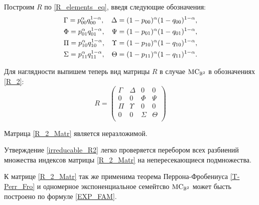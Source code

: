 Построим $R$ по \eqref{R_elements_eq}, введя следующие обозначения:
\begin{align}
\label{R_2}
& \Gamma = p_{00}^\alpha q_{00}^{1 - \alpha}, & \Delta = (1 - p_{00})^\alpha(1 - q_{00})^{1 - \alpha}, \nonumber \\
& \Phi = p_{01}^\alpha q_{01}^{1 - \alpha}, & \Psi = (1 - p_{01})^\alpha(1 - q_{01})^{1 - \alpha}, \nonumber \\
& \Pi = p_{10}^\alpha q_{10}^{1 - \alpha}, & \Upsilon = (1 - p_{10})^\alpha(1 - q_{10})^{1 - \alpha}, \nonumber \\
& \Sigma = p_{11}^\alpha q_{11}^{1 - \alpha}, & \Theta = (1 - p_{11})^\alpha(1 - q_{11})^{1 - \alpha}. 
\end{align}

Для наглядности выпишем теперь вид матрицы $R$ в случае $\mathrm{MC}_{\mathbb{B}^2}$ в обозначениях \eqref{R_2}:
\begin{equation} \label{R_2_Matr}
R = 
\begin{pmatrix}
\Gamma & \Delta & 0 & 0 \\
0 & 0 & \Phi & \Psi \\
\Pi & \Upsilon & 0 & 0 \\
0 & 0 & \Sigma & \Theta \\
\end{pmatrix}
\end{equation}

\begin{ass}
\label{irreducable_R2}
Матрица \eqref{R_2_Matr} является неразложимой. 
\end{ass}

Утверждение \ref{irreducable_R2} легко проверяется перебором всех разбиений множества индексов матрицы \eqref{R_2_Matr} на непересекающиеся подмножества. 

К матрице \eqref{R_2_Matr} так же применима теорема Перрона-Фробениуса \ref{T-Perr_Fro} и одномерное экспоненциальное семейтсво $\mathrm{MC}_{\mathbb{B}^{2}}$ может бысть построено по формуле \eqref{EXP_FAM}. %

\clearpage
